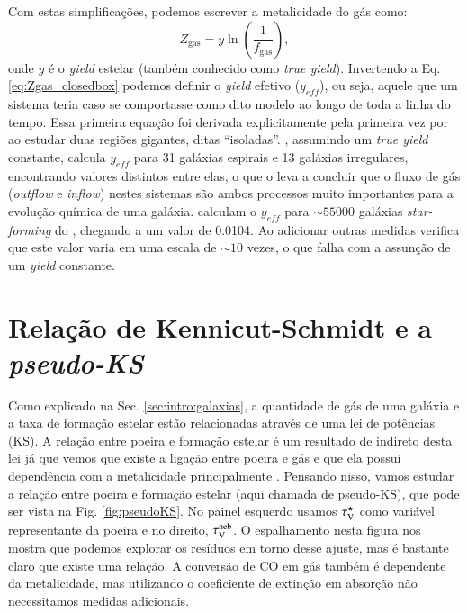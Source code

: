 Com estas simplificações, podemos escrever a metalicidade do gás como:
\begin{equation}
	Z_{\mathrm{gas}} = y \ln \left(\frac{1}{f_{\mathrm{gas}}}\right),
	\label{eq:Zgas_closedbox}
\end{equation}
\noindent onde $y$ é o {\em yield} estelar (também conhecido como {\em true yield}). Invertendo a
Eq. \ref{eq:Zgas_closedbox} podemos definir o {\em yield} efetivo ($y_{eff}$), ou seja, aquele que
um sistema teria caso se comportasse como dito modelo ao longo de toda a linha do tempo. Essa
primeira equação foi derivada explicitamente pela primeira vez por \citet{Searle.Sargent.1972a} ao
estudar duas regiões \Hii gigantes, ditas ``isoladas''. \citet{Garnett.2002a}, assumindo um {\em
true yield} constante, calcula $y_{eff}$ para 31 galáxias espirais e 13 galáxias irregulares,
encontrando valores distintos entre elas, o que o leva a concluir que o fluxo de gás ({\em outflow}
e {\em inflow}) nestes sistemas são ambos processos muito importantes para a evolução química de
uma galáxia. \citet{Tremonti.etal.2004a} calculam o $y_{eff}$ para $\sim 55000$ galáxias {\em
star-forming} do \SDSS, chegando a um valor de 0.0104. Ao adicionar outras medidas verifica que
este valor varia em uma escala de $\sim 10$ vezes, o que falha com a assunção de um {\em yield}
constante.

\section{Relação de Kennicut-Schmidt e a {\em pseudo-KS}}
\label{sec:gasfrac:KS}

Como explicado na Sec. \ref{sec:intro:galaxias}, a quantidade de gás de uma galáxia e a taxa de
formação estelar estão relacionadas através de uma lei de potências (KS). A relação entre poeira e
formação estelar é um resultado de indireto desta lei já que vemos que existe a ligação entre poeira
e gás e que ela possui dependência com a metalicidade principalmente \citep[][e suas
referências]{Magdis.etal.2011a, Leroy.etal.2011a, Santini.etal.2014a}. Pensando nisso, vamos estudar
a relação entre poeira e formação estelar (aqui chamada de pseudo-KS), que pode ser vista na Fig.
\ref{fig:pseudoKS}. No painel esquerdo usamos $\tau_{\mathrm{V}}^\star$ como variável representante da poeira e no
direito, $\tau_{\mathrm{V}}^{\mathrm{neb}}$. O espalhamento nesta figura nos mostra que podemos explorar os resíduos em torno
desse ajuste, mas é bastante claro que existe uma relação. A conversão de CO em gás também é
dependente da metalicidade, mas utilizando o coeficiente de extinção em absorção não necessitamos
medidas adicionais.

